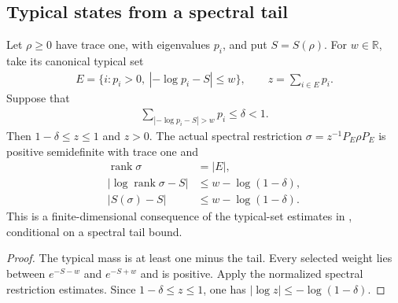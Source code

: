 \subsection{Typical states from a spectral tail}

\begin{theorem}
\label{thm:entropy_typical_density_from_tail}
\leanok
{}
Let $\rho\ge0$ have trace one, with eigenvalues $p_i$, and put $S=S(\rho)$.
For $w\in\mathbb R$, take its canonical typical set
\begin{align}
 E=\{i:p_i>0,\ |-\log p_i-S|\le w\},\qquad z=\sum_{i\in E}p_i.
\end{align}
Suppose that
\begin{align}
 \sum_{|-\log p_i-S|>w}p_i\le\delta<1.
\end{align}
Then $1-\delta\le z\le1$ and $z>0$. The actual spectral restriction
$\sigma=z^{-1}P_E\rho P_E$ is positive semidefinite with trace one and
\begin{align}
 \operatorname{rank}\sigma&=|E|,\\
 |\log\operatorname{rank}\sigma-S|&\le w-\log(1-\delta),\\
 |S(\sigma)-S|&\le w-\log(1-\delta).
\end{align}
This is a finite-dimensional consequence of the typical-set estimates in
\cite[Section~8]{OpenAI2026AreaLaw}, conditional on a spectral tail bound.
\end{theorem}
\begin{proof}
\leanok
The typical mass is at least one minus the tail. Every selected weight lies
between $e^{-S-w}$ and $e^{-S+w}$ and is positive. Apply the normalized spectral
restriction estimates. Since $1-\delta\le z\le1$, one has
$|\log z|\le-\log(1-\delta)$.
\end{proof}

